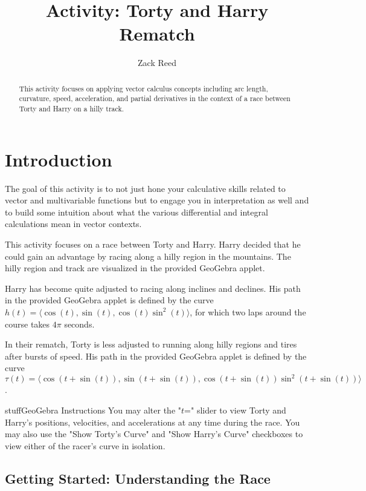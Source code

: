 \documentclass{ximera}
\title{Activity: Torty and Harry Rematch}
\author{Zack Reed}
\begin{document}
\begin{abstract}
This activity focuses on applying vector calculus concepts including arc length, curvature, speed, acceleration, and partial derivatives in the context of a race between Torty and Harry on a hilly track.
\end{abstract}
\maketitle

\section*{Introduction}

The goal of this activity is to not just hone your calculative skills related to vector and multivariable functions but to engage you in interpretation as well and to build some intuition about what the various differential and integral calculations mean in vector contexts.

This activity focuses on a race between Torty and Harry. Harry decided that he could gain an advantage by racing along a hilly region in the mountains. The hilly region and track are visualized in the provided GeoGebra applet.

Harry has become quite adjusted to racing along inclines and declines. His path in the provided GeoGebra applet is defined by the curve $h(t)=\langle \cos(t), \sin(t), \cos(t)\sin^2(t)\rangle$, for which two laps around the course takes $4 \pi$ seconds.

In their rematch, Torty is less adjusted to running along hilly regions and tires after bursts of speed. His path in the provided GeoGebra applet is defined by the curve $\tau (t)=\langle \cos(t+\sin(t)), \sin(t+\sin(t)), \cos(t+\sin(t))\sin^2(t+\sin(t))\rangle$.

\begin{expandable}{stuff}{GeoGebra Instructions}
    You may alter the "$t$=" slider to view Torty and Harry's positions, velocities, and accelerations at any time during the race. You may also use the "Show Torty's Curve" and "Show Harry's Curve" checkboxes to view either of the racer's curve in isolation.
\end{expandable}

\begin{center}
\end{center}

\subsection*{Getting Started: Understanding the Race}
\end{document}
